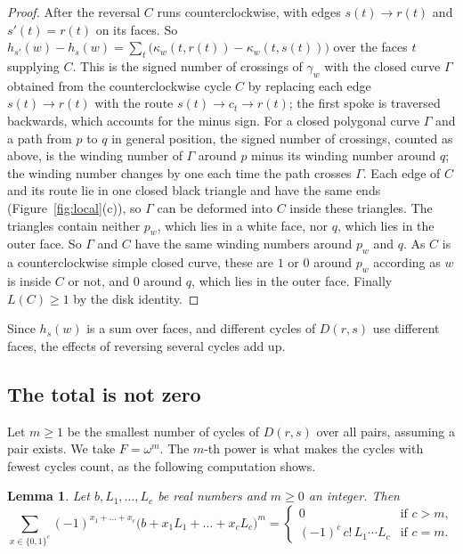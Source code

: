 \documentclass[10pt]{amsart}
\numberwithin{equation}{section}
\newtheorem{lemma}[equation]{Lemma}
\theoremstyle{definition}
\theoremstyle{remark}
\newcommand{\Dc}{D}
\begin{document}
\begin{proof}
After the reversal $C$ runs counterclockwise, with edges $s(t)\to r(t)$ and $s'(t)=r(t)$ on its faces.
So $h_{s'}(w)-h_s(w)=\sum_{t}\bigl(\kappa_w(t,r(t))-\kappa_w(t,s(t))\bigr)$ over the faces $t$ supplying $C$.
This is the signed number of crossings of $\gamma_w$ with the closed curve $\Gamma$ obtained from the counterclockwise cycle $C$ by replacing each edge $s(t)\to r(t)$ with the route $s(t)\to c_t\to r(t)$; the first spoke is traversed backwards, which accounts for the minus sign.
For a closed polygonal curve $\Gamma$ and a path from $p$ to $q$ in general position, the signed number of crossings, counted as above, is the winding number of $\Gamma$ around $p$ minus its winding number around $q$; the winding number changes by one each time the path crosses $\Gamma$.
Each edge of $C$ and its route lie in one closed black triangle and have the same ends (Figure~\ref{fig:local}(c)), so $\Gamma$ can be deformed into $C$ inside these triangles.
The triangles contain neither $p_w$, which lies in a white face, nor $q$, which lies in the outer face.
So $\Gamma$ and $C$ have the same winding numbers around $p_w$ and $q$.
As $C$ is a counterclockwise simple closed curve, these are $1$ or $0$ around $p_w$ according as $w$ is inside $C$ or not, and $0$ around $q$, which lies in the outer face.
Finally $L(C)\ge1$ by the disk identity.
\end{proof}

Since $h_s(w)$ is a sum over faces, and different cycles of $\Dc(r,s)$ use different faces, the effects of reversing several cycles add up.

\subsection*{The total is not zero}
Let $m\ge1$ be the smallest number of cycles of $\Dc(r,s)$ over all pairs, assuming a pair exists.
We take $F=\omega^m$.
The $m$-th power is what makes the cycles with fewest cycles count, as the following computation shows.

\begin{lemma}\label{lem:difference}
Let $b,L_1,\dots,L_c$ be real numbers and $m\ge0$ an integer.
Then
\[
\sum_{x\in\{0,1\}^c}(-1)^{x_1+\dots+x_c}\bigl(b+x_1L_1+\dots+x_cL_c\bigr)^m
=\begin{cases}0 & \text{if } c>m,\\ (-1)^c\,c!\,L_1\cdots L_c & \text{if } c=m.\end{cases}
\]
\end{lemma}
\end{document}
